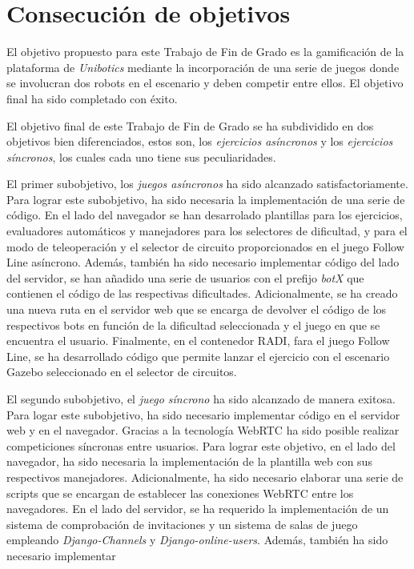 \documentclass[a4paper, 12pt]{book}
\begin{document}
\section{Consecución de objetivos}
\label{sec:consecucion-objetivos}

El objetivo propuesto para este Trabajo de Fin de Grado es la gamificación de la plataforma de \emph{Unibotics} mediante la incorporación de una serie de juegos donde se involucran dos robots en el escenario y deben competir entre ellos. El objetivo final ha sido completado con éxito.

El objetivo final de este Trabajo de Fin de Grado se ha subdividido en dos objetivos bien diferenciados, estos son, los \emph{ejercicios asíncronos} y los \emph{ejercicios síncronos}, los cuales cada uno tiene sus peculiaridades.

El primer subobjetivo, los \emph{juegos asíncronos} ha sido alcanzado satisfactoriamente. Para lograr este subobjetivo, ha sido necesaria la implementación de una serie de código. En el lado del navegador se han desarrolado plantillas para los ejercicios, evaluadores automáticos y manejadores para los selectores de dificultad, y para el modo de teleoperación y el selector de circuito proporcionados en el juego Follow Line asíncrono. Además, también ha sido necesario implementar código del lado del servidor, se han añadido una serie de usuarios con el prefijo \emph{botX} que contienen el código de las respectivas dificultades. Adicionalmente, se ha creado una nueva ruta en el servidor web que se encarga de devolver el código de los respectivos bots en función de la dificultad seleccionada y el juego en que se encuentra el usuario. Finalmente, en el contenedor RADI, fara el juego Follow Line, se ha desarrollado código que permite lanzar el ejercicio con el escenario Gazebo seleccionado en el selector de circuitos.

El segundo subobjetivo, el \emph{juego síncrono} ha sido alcanzado de manera exitosa. Para logar este subobjetivo, ha sido necesario implementar código en el servidor web y en el navegador. Gracias a la tecnología WebRTC ha sido posible realizar competiciones síncronas entre usuarios. Para lograr este objetivo, en el lado del navegador, ha sido necesaria la implementación de la plantilla web con sus respectivos manejadores. Adicionalmente, ha sido necesario elaborar una serie de scripts que se encargan de establecer las conexiones WebRTC entre los navegadores. En el lado del servidor, se ha requerido la implementación de un sistema de comprobación de invitaciones y un sistema de salas de juego empleando \emph{Django-Channels} y \emph{Django-online-users}. Además, también ha sido necesario implementar 
\end{document}
